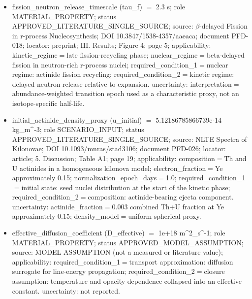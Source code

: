 \documentclass[11pt]{article}
\begin{document}
\begin{itemize}
\item fission\_\allowbreak{}neutron\_\allowbreak{}release\_\allowbreak{}timescale (tau\_\allowbreak{}f) \ensuremath{=} 2.3 s; role MATERIAL\_\allowbreak{}PROPERTY; status APPROVED\_\allowbreak{}LITERATURE\_\allowbreak{}SINGLE\_\allowbreak{}SOURCE; source: $\beta$-delayed Fission in r-process Nucleosynthesis; DOI 10.3847/\allowbreak{}1538-4357/\allowbreak{}aaeaca; document PFD-018; locator: preprint; III. Results; Figure 4; page 5; applicability: kinetic\_\allowbreak{}regime\ensuremath{=}late fission-recycling phase; nuclear\_\allowbreak{}regime\ensuremath{=}beta-delayed fission in neutron-rich r-process nuclei; required\_\allowbreak{}condition\_\allowbreak{}1\ensuremath{=}nuclear regime: actinide fission recycling; required\_\allowbreak{}condition\_\allowbreak{}2\ensuremath{=}kinetic regime: delayed neutron release relative to expansion. uncertainty: interpretation\ensuremath{=}abundance-weighted transition epoch used as a characteristic proxy, not an isotope-specific half-life.
\item initial\_\allowbreak{}actinide\_\allowbreak{}density\_\allowbreak{}proxy (u\_\allowbreak{}initial) \ensuremath{=} 5.12186785866739e-14 kg\_\allowbreak{}m\textasciicircum{}-3; role SCENARIO\_\allowbreak{}INPUT; status APPROVED\_\allowbreak{}LITERATURE\_\allowbreak{}SINGLE\_\allowbreak{}SOURCE; source: NLTE Spectra of Kilonovae; DOI 10.1093/\allowbreak{}mnras/\allowbreak{}stad3106; document PFD-026; locator: article; 5. Discussion; Table A1; page 19; applicability: composition\ensuremath{=}Th and U actinides in a homogeneous kilonova model; electron\_\allowbreak{}fraction\ensuremath{=}Ye approximately 0.15; normalization\_\allowbreak{}epoch\_\allowbreak{}days\ensuremath{=}1.0; required\_\allowbreak{}condition\_\allowbreak{}1\ensuremath{=}initial state: seed nuclei distribution at the start of the kinetic phase; required\_\allowbreak{}condition\_\allowbreak{}2\ensuremath{=}composition: actinide-bearing ejecta component. uncertainty: actinide\_\allowbreak{}fraction\ensuremath{=}0.003 combined Th+U fraction at Ye approximately 0.15; density\_\allowbreak{}model\ensuremath{=}uniform spherical proxy.
\item effective\_\allowbreak{}diffusion\_\allowbreak{}coefficient (D\_\allowbreak{}effective) \ensuremath{=} 1e+18 m\textasciicircum{}2\_\allowbreak{}s\textasciicircum{}-1; role MATERIAL\_\allowbreak{}PROPERTY; status APPROVED\_\allowbreak{}MODEL\_\allowbreak{}ASSUMPTION; source: MODEL ASSUMPTION (not a measured or literature value); applicability: required\_\allowbreak{}condition\_\allowbreak{}1\ensuremath{=}transport approximation: diffusion surrogate for line-energy propagation; required\_\allowbreak{}condition\_\allowbreak{}2\ensuremath{=}closure assumption: temperature and opacity dependence collapsed into an effective constant. uncertainty: not reported.

\end{itemize}
\end{document}

